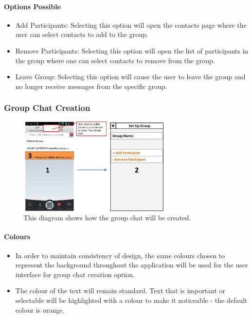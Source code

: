 \documentclass[11pt]{article}
\begin{document}
\paragraph{Options Possible}
\begin{itemize}
\item	Add Participants: Selecting this option will open the contacts page where the user can select contacts to add to the group.
\item 	Remove Participants: Selecting this option will open the list of participants in the group where one can select contacts to remove from the group.
\item Leave Group: Selecting this option will cause the user to leave the group and no longer receive messages from the specific group.\\
\end{itemize}



\subsubsection{Group Chat Creation}
\begin{figure}[H]
\centering
\includegraphics[width=3in]{./images/CG.jpg}
\caption[Create Group Chat]{This diagram shows how the group chat will be created.}
\label{cd-cg}
\end{figure}

\paragraph{Colours}
\begin{itemize}
\item	In order to maintain consistency of design, the same colours chosen to represent the background throughout the application will be used for the user interface for group chat creation option.
\item	The colour of the text will remain standard. Text that is important or selectable will be highlighted with a colour to make it noticeable - the default colour is orange. 	\\
\end{itemize}  
               
\end{document}
